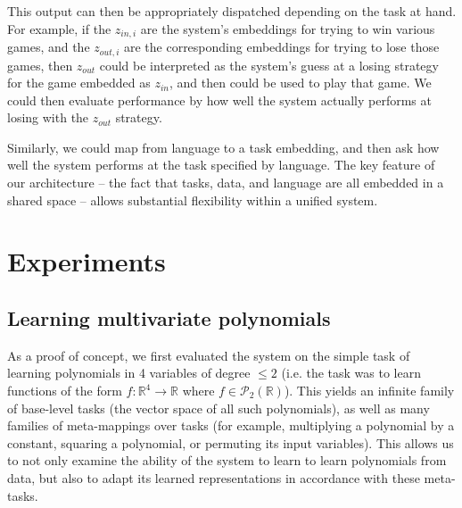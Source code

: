 \documentclass{article}
\begin{document}
This output can then be appropriately dispatched depending on the task at hand. For example, if the $z_{in,i}$ are the system's embeddings for trying to win various games, and the $z_{out,i}$ are the corresponding embeddings for trying to lose those games, then $z_{out}$ could be interpreted as the system's guess at a losing strategy for the game embedded as $z_{in}$, and then could be used to play that game. We could then evaluate performance by how well the system actually performs at losing with the $z_{out}$ strategy. \par
Similarly, we could map from language to a task embedding, and then ask how well the system performs at the task specified by language. The key feature of our architecture -- the fact that tasks, data, and language are all embedded in a shared space -- allows substantial flexibility within a unified system. 

\section{Experiments}

%
\subsection{Learning multivariate polynomials}
As a proof of concept, we first evaluated the system on the simple task of learning polynomials in 4 variables of degree $\leq 2$ (i.e. the task was to learn functions of the form $f: \mathbb{R}^4 \rightarrow \mathbb{R}$ where $f \in \mathcal{P}_2 \left(\mathbb{R}\right)$). This yields an infinite family of base-level tasks (the vector space of all such polynomials), as well as many families of meta-mappings over tasks (for example, multiplying a polynomial by a constant, squaring a polynomial, or permuting its input variables). This allows us to not only examine the ability of the system to learn to learn polynomials from data, but also to adapt its learned representations in accordance with these meta-tasks. \par
\end{document}
